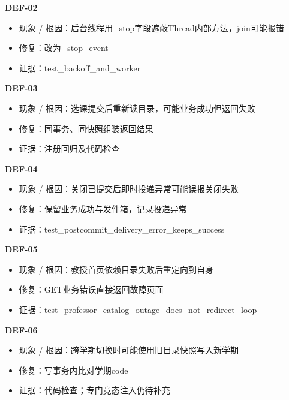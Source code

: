 \documentclass[UTF8,11pt,a4paper]{ctexart}
\providecommand{\tightlist}{\setlength{\itemsep}{0pt}\setlength{\parskip}{0pt}}
\begin{document}
\textbf{DEF-02}

\begin{itemize}
\tightlist
\item
  现象 / 根因：后台线程用\_\allowbreak{}stop字段遮蔽Thread内部方法，join可能报错
\item
  修复：改为\_\allowbreak{}stop\_\allowbreak{}event
\item
  证据：test\_\allowbreak{}backoff\_\allowbreak{}and\_\allowbreak{}worker
\end{itemize}

\textbf{DEF-03}

\begin{itemize}
\tightlist
\item
  现象 / 根因：选课提交后重新读目录，可能业务成功但返回失败
\item
  修复：同事务、同快照组装返回结果
\item
  证据：注册回归及代码检查
\end{itemize}

\textbf{DEF-04}

\begin{itemize}
\tightlist
\item
  现象 / 根因：关闭已提交后即时投递异常可能误报关闭失败
\item
  修复：保留业务成功与发件箱，记录投递异常
\item
  证据：test\_\allowbreak{}postcommit\_\allowbreak{}delivery\_\allowbreak{}error\_\allowbreak{}keeps\_\allowbreak{}success
\end{itemize}

\textbf{DEF-05}

\begin{itemize}
\tightlist
\item
  现象 / 根因：教授首页依赖目录失败后重定向到自身
\item
  修复：GET业务错误直接返回故障页面
\item
  证据：test\_\allowbreak{}professor\_\allowbreak{}catalog\_\allowbreak{}outage\_\allowbreak{}does\_\allowbreak{}not\_\allowbreak{}redirect\_\allowbreak{}loop
\end{itemize}

\textbf{DEF-06}

\begin{itemize}
\tightlist
\item
  现象 / 根因：跨学期切换时可能使用旧目录快照写入新学期
\item
  修复：写事务内比对学期code
\item
  证据：代码检查；专门竞态注入仍待补充
\end{itemize}
\end{document}
